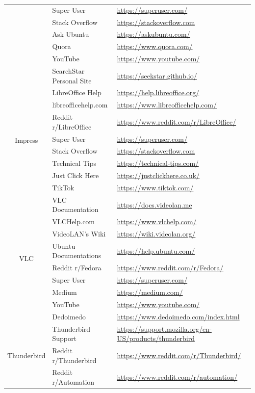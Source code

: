 \begin{longtable}{cll}
&   Super User & \url{https://superuser.com/} \\
&   Stack Overflow & \url{https://stackoverflow.com} \\
&   Ask Ubuntu & \url{https://askubuntu.com/} \\
&   Quora & \url{https://www.quora.com/} \\
&   YouTube & \url{https://www.youtube.com/} \\
&   SearchStar Personal Site & \url{https://seekstar.github.io/} \\
\hline
\multirow{8}{*}{Impress} & LibreOffice Help & \url{https://help.libreoffice.org/} \\
&   libreofficehelp.com & \url{https://www.libreofficehelp.com/} \\
&   Reddit r/LibreOffice & \url{https://www.reddit.com/r/LibreOffice/} \\
& Super User & \url{https://superuser.com/} \\
&   Stack Overflow & \url{https://stackoverflow.com} \\
& Technical Tips & \url{https://technical-tips.com/} \\
&   Just Click Here & \url{https://justclickhere.co.uk/} \\
&   TikTok & \url{https://www.tiktok.com/} \\
\hline
\multirow{9}{*}{VLC} &  VLC Documentation & \url{https://docs.videolan.me} \\
&   VLCHelp.com & \url{https://www.vlchelp.com/} \\
&   VideoLAN's Wiki & \url{https://wiki.videolan.org/} \\
&   Ubuntu Documentations & \url{https://help.ubuntu.com/} \\
&   Reddit r/Fedora & \url{https://www.reddit.com/r/Fedora/}\\
&   Super User & \url{https://superuser.com/} \\
&   Medium & \url{https://medium.com/} \\
&   YouTube & \url{https://www.youtube.com/} \\
&   Dedoimedo & \url{https://www.dedoimedo.com/index.html} \\
\hline
\multirow{8}{*}{Thunderbird} &  Thunderbird Support & \url{https://support.mozilla.org/en-US/products/thunderbird}\\
&   Reddit r/Thunderbird & \url{https://www.reddit.com/r/Thunderbird/} \\
&   Reddit r/Automation & \url{https://www.reddit.com/r/automation/} \\

\end{longtable}
